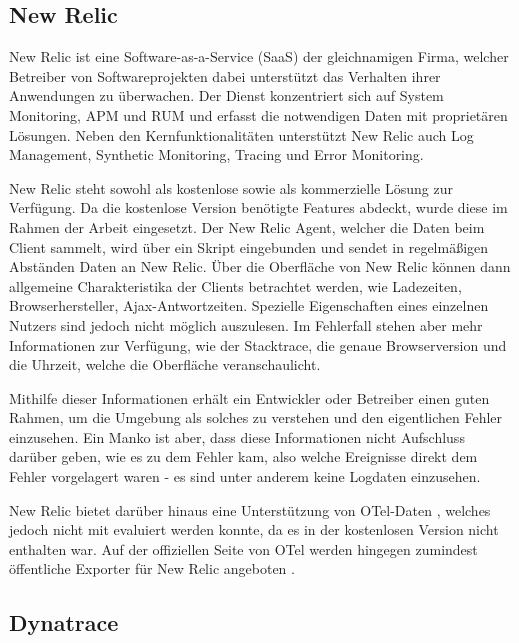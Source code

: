 \subsection{New Relic}

New Relic \cite{NewRelic} ist eine Software-as-a-Service (SaaS) der gleichnamigen Firma, welcher Betreiber von Softwareprojekten dabei unterstützt das Verhalten ihrer Anwendungen zu überwachen. Der Dienst konzentriert sich auf System Monitoring, APM und RUM und erfasst die notwendigen Daten mit proprietären Lösungen. Neben den Kernfunktionalitäten unterstützt New Relic auch Log Management, Synthetic Monitoring, Tracing und Error Monitoring.


New Relic steht sowohl als kostenlose sowie als kommerzielle Lösung zur Verfügung. Da die kostenlose Version benötigte Features abdeckt, wurde diese im Rahmen der Arbeit eingesetzt. Der New Relic Agent, welcher die Daten beim Client sammelt, wird über ein Skript eingebunden und sendet in regelmäßigen Abständen Daten an New Relic. Über die Oberfläche von New Relic können dann allgemeine Charakteristika der Clients betrachtet werden, wie Ladezeiten, Browserhersteller, Ajax-Antwortzeiten. Spezielle Eigenschaften eines einzelnen Nutzers sind jedoch nicht möglich auszulesen. Im Fehlerfall stehen aber mehr Informationen zur Verfügung, wie der Stacktrace, die genaue Browserversion und die Uhrzeit, welche die Oberfläche veranschaulicht.

Mithilfe dieser Informationen erhält ein Entwickler oder Betreiber einen guten Rahmen, um die Umgebung als solches zu verstehen und den eigentlichen Fehler einzusehen. Ein Manko ist aber, dass diese Informationen nicht Aufschluss darüber geben, wie es zu dem Fehler kam, also welche Ereignisse direkt dem Fehler vorgelagert waren - es sind unter anderem keine Logdaten einzusehen.

New Relic bietet darüber hinaus eine Unterstützung von OTel-Daten  \cite{NewRelicAnnoundOTelBetaSupport}, welches jedoch nicht mit evaluiert werden konnte, da es in der kostenlosen Version nicht enthalten war. Auf der offiziellen Seite von OTel werden hingegen zumindest öffentliche Exporter für New Relic angeboten \cite{OpenTelemetryRegistry}.

\subsection{Dynatrace}


